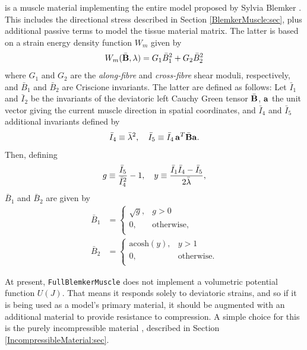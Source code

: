 is a muscle material implementing the entire model proposed by Sylvia
Blemker \cite{blemker:2005:muscle}. This includes the directional
stress described in Section \ref{BlemkerMuscle:sec}, plus additional
passive terms to model the tissue material matrix. The latter is based
on a strain energy density function $W_m$ given by
%
\begin{equation}
W_m(\bar{{\bf B}},\lambda) = G_1 \bar B_1^2 + G_2 \bar B_2^2
\end{equation}
%
where $G_1$ and $G_2$ are the {\it along-fibre} and {\it cross-fibre}
shear moduli, respectively, and $\bar B_1$ and $\bar B_2$ are
Criscione invariants. The latter are defined as follows: Let $\bar
I_1$ and $\bar I_2$ be the invariants of the deviatoric left Cauchy
Green tensor $\bar{{\bf B}}$, ${\bf a}$ the unit vector giving the current muscle
direction in spatial coordinates, and $\bar I_4$ and $\bar I_5$
additional invariants defined by
%
\begin{equation}
\bar I_4 \equiv \bar\lambda^2, \quad \bar I_5 \equiv \bar I_4 \, {\bf a}^T \bar{{\bf B}} {\bf a}.
\end{equation}
%
Then, defining
%
\begin{equation*}
g \equiv \frac{\bar I_5}{\bar I_4^2} - 1, \quad
y \equiv \frac{\bar I_1 \bar I_4 - \bar I_5}{2 \bar\lambda},
\end{equation*}
%
$\bar B_1$ and $\bar B_2$ are given by
%
\begin{align}
\bar B_1 & =
\begin{cases}
\sqrt{g}, & g > 0 \\
0, & \mathrm{otherwise}, \\
\end{cases} \\
\bar B_2 & =
\begin{cases}
\mathrm{acosh}(y), & y > 1 \\
0, & \mathrm{otherwise}. \\
\end{cases}
\end{align}
%

\begin{sideblock}
At present, {\tt FullBlemkerMuscle} does not implement a volumetric
potential function $U(J)$. That means it responds solely to deviatoric
strains, and so if it is being used as a model's primary material, it
should be augmented with an additional material to provide resistance
to compression. A simple choice for this is the purely incompressible
material
, described in Section
\ref{IncompressibleMaterial:sec}.
\end{sideblock}

